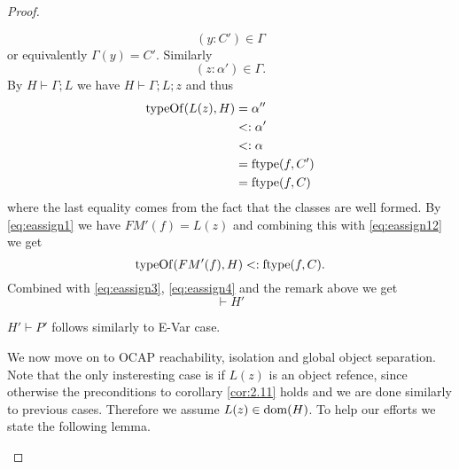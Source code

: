 \begin{proof}
\begin{description}
\begin{description}
\begin{description}
              \begin{equation}\label{eq:eassign10}
                (y: C') \in \Gamma 
              \end{equation}
              or equivalently $\Gamma(y) = C'$.
              Similarly
              \begin{equation} \label{eq:eassign11}
                (z: \alpha') \in \Gamma.
              \end{equation}
              By $H \vdash \Gamma; L$ we have $H \vdash \Gamma; L; z$ and thus
              \begin{equation} \label{eq:eassign12}
                \begin{aligned}
                  \mbox{$\mathrm{typeOf}$}(L(z), H) &= \alpha'' \\ 
                                   &<: \alpha' \\ 
                                   &<: \alpha \\ 
                                   &= \mbox{$\mathrm{ftype}$}(f, C') \\ 
                                   &= \mbox{$\mathrm{ftype}$}(f, C)
                \end{aligned}
              \end{equation}
              where the last equality comes from the fact that the classes are
              well formed. By \eqref{eq:eassign1} we have $FM'(f) = L(z)$ and
              combining this with \eqref{eq:eassign12} we get
              \begin{equation} \label{eq:eassign13}
                \mbox{$\mathrm{typeOf}$}(FM'(f), H) <: \mbox{$\mathrm{ftype}$}(f, C).
              \end{equation}
              Combined with \eqref{eq:eassign3}, \eqref{eq:eassign4} and the
              remark above we get
              \begin{equation*} 
                \vdash H'
              \end{equation*}

              $H' \vdash P'$ follows similarly to {\sc E-Var} case.

              We now move on to OCAP reachability, isolation and global object
              separation.  Note that the only insteresting case is if $L(z)$ is
              an object refence, since otherwise the preconditions to corollary
              \ref{cor:2.11} holds and we are done similarly to previous cases.
              Therefore we assume $L(z) \in \mbox{$\mathrm{dom}$}(H)$.  To help our efforts we
              state the following lemma.


\end{description}
\end{description}
\end{description}
\end{proof}
